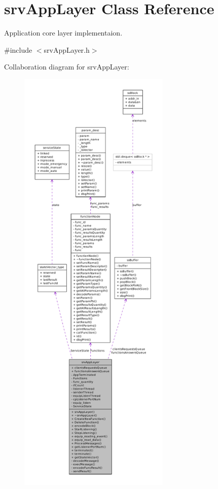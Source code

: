 \hypertarget{classsrvAppLayer}{
\section{srvAppLayer Class Reference}
\label{d8/d72/classsrvAppLayer}
}


Application core layer implementaion.  




{\ttfamily \#include $<$srvAppLayer.h$>$}



Collaboration diagram for srvAppLayer:\nopagebreak
\begin{figure}[H]
\begin{center}
\leavevmode
\includegraphics[height=600pt]{d6/d33/classsrvAppLayer__coll__graph}
\end{center}
\end{figure}
